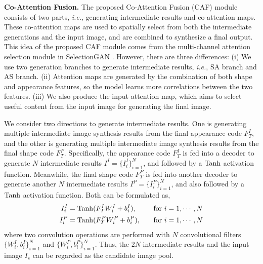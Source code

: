 \documentclass[runningheads]{llncs}
\begin{document}
\noindent \textbf{Co-Attention Fusion.}
The proposed Co-Attention Fusion (CAF) module consists of two parts, \emph{i.e.}, generating intermediate results and co-attention maps.
These co-attention maps are used to spatially select from both the intermediate generations and the input image, and are combined to synthesize a final output.
This idea of the proposed CAF module comes from the multi-channel attention selection module in SelectionGAN \cite{tang2019multi}.
However, there are three differences: (i) We use two generation branches to generate intermediate results, \emph{i.e.}, SA branch and AS branch.
(ii) Attention maps are generated by the combination of both shape and appearance features, so the model learns more correlations between the two features.
(iii) We also produce the input attention map, which aims to select useful content from the input image for generating the final image.

We consider two directions to generate intermediate results.
One is generating multiple intermediate image synthesis results from the final appearance code $F_T^I$, and the other is generating multiple intermediate image synthesis results from the final shape code $F_T^P$.
Specifically, the appearance code $F_T^I$ is fed into a decoder to generate $N$ intermediate results $I^I{=}\{I_i^I\}_{i=1}^N$, and followed by a $\rm{Tanh}$ activation function.
Meanwhile, the final shape code $F_T^P$ is fed into another decoder to generate another $N$ intermediate results $I^P{=}\{I_i^P\}_{i=1}^{N}$, and also followed by a $\rm{Tanh}$ activation function.
Both can be formulated as,
\begin{equation}
\begin{aligned}
I_i^I = {}& {\rm Tanh}(F_T^I W_i^I +b_i^I),  & \quad   {\rm for}~i  =  1, \cdots, N \\
I_i^P ={} & {\rm Tanh}(F_T^P W_i^P +b_i^P),  & \quad   {\rm for}~i  =  1, \cdots, N
\end{aligned}
\end{equation}
where two convolution operations are performed with $N$ convolutional filters $\{W_i^I, b_i^I\}_{i=1}^{N}$ and $\{W_i^P, b_i^P\}_{i=1}^{N}$.
Thus, the $2N$ intermediate results and the input image $I_s$ can be regarded as the candidate image pool.
\end{document}
